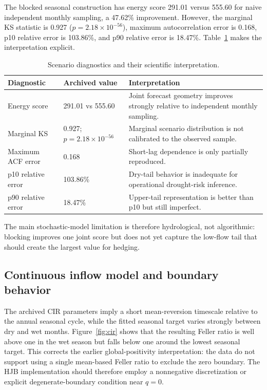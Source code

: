 \documentclass[11pt,a4paper]{article}
\begin{document}
The blocked seasonal construction has energy score 291.01 versus 555.60 for
naive independent monthly sampling, a 47.62\% improvement. However, the marginal
KS statistic is 0.927 ($p=2.18\times10^{-56}$), maximum autocorrelation error is
0.168, p10 relative error is 103.86\%, and p90 relative error is 18.47\%.
Table~\ref{tab:scenario_diag} makes the interpretation explicit.

\begin{table}[t]
\centering
\caption{Scenario diagnostics and their scientific interpretation.}
\label{tab:scenario_diag}
\begin{tabular}{>{\raggedright\arraybackslash}p{}p{}>{\raggedright\arraybackslash}p{}}
\toprule
Diagnostic & Archived value & Interpretation \\
\midrule
Energy score & 291.01 vs 555.60 & Joint forecast geometry improves strongly relative to independent monthly sampling. \\
Marginal KS & 0.927; $p=2.18\times10^{-56}$ & Marginal scenario distribution is not calibrated to the observed sample. \\
Maximum ACF error & 0.168 & Short-lag dependence is only partially reproduced. \\
p10 relative error & 103.86\% & Dry-tail behavior is inadequate for operational drought-risk inference. \\
p90 relative error & 18.47\% & Upper-tail representation is better than p10 but still imperfect. \\
\bottomrule
\end{tabular}
\end{table}

The main stochastic-model limitation is therefore hydrological, not algorithmic:
blocking improves one joint score but does not yet capture the low-flow tail that
should create the largest value for hedging.

\subsection{Continuous inflow model and boundary behavior}
The archived CIR parameters imply a short mean-reversion timescale relative to the
annual seasonal cycle, while the fitted seasonal target varies strongly between
dry and wet months. Figure~\ref{fig:cir} shows that the resulting Feller ratio is
well above one in the wet season but falls below one around the lowest seasonal
target. This corrects the earlier global-positivity interpretation: the data do
not support using a single mean-based Feller ratio to exclude the zero boundary.
The HJB implementation should therefore employ a nonnegative discretization or
explicit degenerate-boundary condition near $q=0$.
\end{document}
